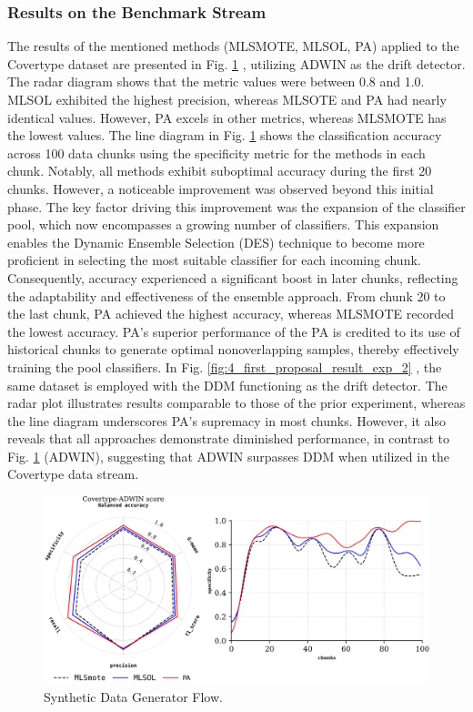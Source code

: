 \subsubsection{Results on the Benchmark Stream}
The results of the mentioned methods (MLSMOTE, MLSOL, PA) applied to the Covertype dataset are presented in Fig. \ref{fig:4_first_proposal_result_exp_1}
, utilizing ADWIN as the drift detector. The radar diagram shows that the metric values were between 0.8 and 1.0. MLSOL exhibited the highest precision, whereas MLSOTE and PA had nearly identical values. However, PA excels in other metrics, whereas MLSMOTE has the lowest values. The line diagram in Fig. \ref{fig:4_first_proposal_result_exp_1}
shows the classification accuracy across 100 data chunks using the specificity metric for the methods in each chunk. Notably, all methods exhibit suboptimal accuracy during the first 20 chunks. However, a noticeable improvement was observed beyond this initial phase. The key factor driving this improvement was the expansion of the classifier pool, which now encompasses a growing number of classifiers. This expansion enables the Dynamic Ensemble Selection (DES) technique to become more proficient in selecting the most suitable classifier for each incoming chunk. Consequently, accuracy experienced a significant boost in later chunks, reflecting the adaptability and effectiveness of the ensemble approach. From chunk 20 to the last chunk, PA achieved the highest accuracy, whereas MLSMOTE recorded the lowest accuracy. PA's superior performance of the PA is credited to its use of historical chunks to generate optimal nonoverlapping samples, thereby effectively training the pool classifiers. In Fig. \ref{fig:4_first_proposal_result_exp_2}
, the same dataset is employed with the DDM functioning as the drift detector. The radar plot illustrates results comparable to those of the prior experiment, whereas the line diagram underscores PA's supremacy in most chunks. However, it also reveals that all approaches demonstrate diminished performance, in contrast to Fig. \ref{fig:4_first_proposal_result_exp_1} (ADWIN), suggesting that ADWIN surpasses DDM when utilized in the Covertype data stream.


\begin{figure}[!ht]
	\centering
	\includegraphics[width=1\linewidth]{4_Taxonomy/figures/exp_1.png}
	\caption{Synthetic Data Generator Flow.}
	\label{fig:4_first_proposal_result_exp_1}
\end{figure}


